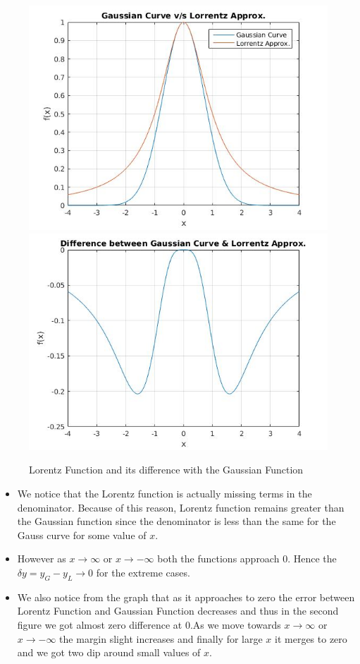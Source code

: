 \documentclass{article}
\begin{document}
\begin{figure}[!h]
    \centering
    \includegraphics[scale = 0.4]{9}
    \includegraphics[scale = 0.4]{10}
    \caption{Lorentz Function and its difference with the Gaussian Function}
    \label{fig:my_label}
\end{figure}

\begin{itemize}
    \item We notice that the Lorentz function is actually missing terms in the denominator. Because of this reason, Lorentz function remains greater than the Gaussian function since the denominator is less than the same for the Gauss curve for some value of $x$.
    \item However as $x \to \infty$ or $x \to -\infty$ both the functions approach 0. Hence the $\delta y = y_G - y_L \to 0$ for the extreme cases.
    \item We also notice from the graph that as it approaches to zero the error between Lorentz Function and Gaussian Function decreases and thus in the second figure we got almost zero difference at $0$.As we move towards $x \to \infty$ or $x \to -\infty$ the margin slight increases and finally for large $x$ it merges to zero and we got two dip around small values of $x$.
\end{itemize}
\end{document}
